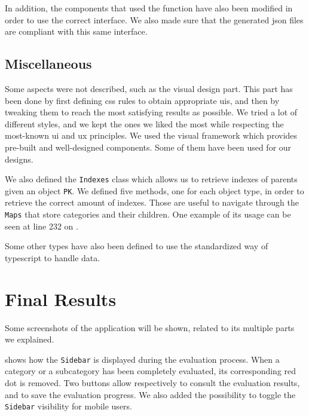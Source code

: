 In addition, the components that used the  function have also been modified in order to use the correct  interface. We also made sure that the generated \gls{json} files are compliant with this same interface.

\subsection{Miscellaneous}
\label{subsec:app_implementation_misc}

Some aspects were not described, such as the visual design part. This part has been done by first defining \gls{css} rules to obtain appropriate \glspl{ui}, and then by tweaking them to reach the most satisfying results as possible. We tried a lot of different styles, and we kept the ones we liked the most while respecting the most-known \gls{ui} and \gls{ux} principles. We used the  visual \gls{framework} which provides pre-built and well-designed components. Some of them have been used for our designs.

We also defined the \texttt{Indexes} class which allows us to retrieve indexes of parents given an object \texttt{PK}. We defined five methods, one for each object type, in order to retrieve the correct amount of indexes. Those are useful to navigate through the \texttt{Maps} that store categories and their children. One example of its usage can be seen at line 232 on .

Some other types have also been defined to use the standardized way of \gls{typescript} to handle data.

\section{Final Results}
\label{sec:app_results}

Some screenshots of the application will be shown, related to its multiple parts we explained.

 shows how the \texttt{Sidebar} is displayed during the evaluation process. When a category or a subcategory has been completely evaluated, its corresponding red dot is removed. Two buttons allow respectively to consult the evaluation results, and to save the evaluation progress. We also added the possibility to toggle the \texttt{Sidebar} visibility for mobile users.


